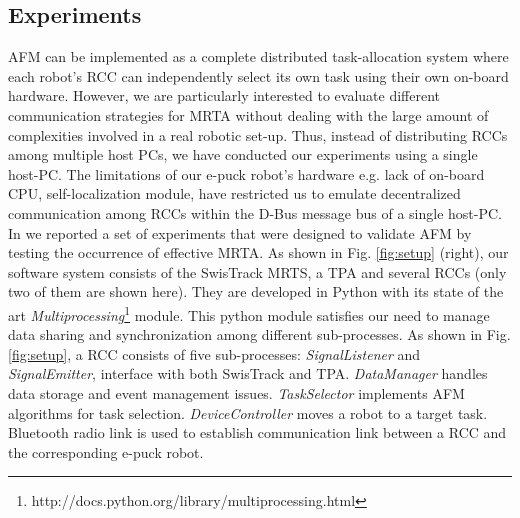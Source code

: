 \documentclass{ifacconf}
\begin{document}
\subsection{Experiments}
AFM can be implemented as a complete distributed task-allocation system where each robot's RCC can independently select its own task using their own on-board hardware. However, we are particularly interested to evaluate different communication strategies for MRTA without dealing with the large amount of complexities involved in a real robotic set-up. Thus, instead of distributing RCCs among multiple host PCs, we have conducted our experiments using a single host-PC. The limitations of our e-puck robot's hardware e.g. lack of on-board CPU, self-localization module, have restricted us to emulate decentralized communication among RCCs within the D-Bus message bus of a single host-PC.\\ 
In \cite{Sarker+2010ants} we reported a set of experiments that were designed to validate AFM by testing the occurrence of effective MRTA.  As shown in Fig. \ref{fig:setup} (right), our software system consists of the SwisTrack MRTS, a TPA and several RCCs (only two of them are shown here). They are developed in Python with its state of the art \textit{Multiprocessing}\footnote{http://docs.python.org/library/multiprocessing.html} module. This python module satisfies our need to manage data sharing and synchronization among different sub-processes. As shown in Fig. \ref{fig:setup}, a RCC consists of five sub-processes: {\em SignalListener} and {\em SignalEmitter}, interface with both SwisTrack and TPA. {\em DataManager} handles data storage and event management issues. {\em TaskSelector} implements AFM algorithms for task selection. {\em DeviceController} moves a robot to a target task. Bluetooth radio link is used to establish communication link between a RCC and the corresponding e-puck robot.  
\end{document}
